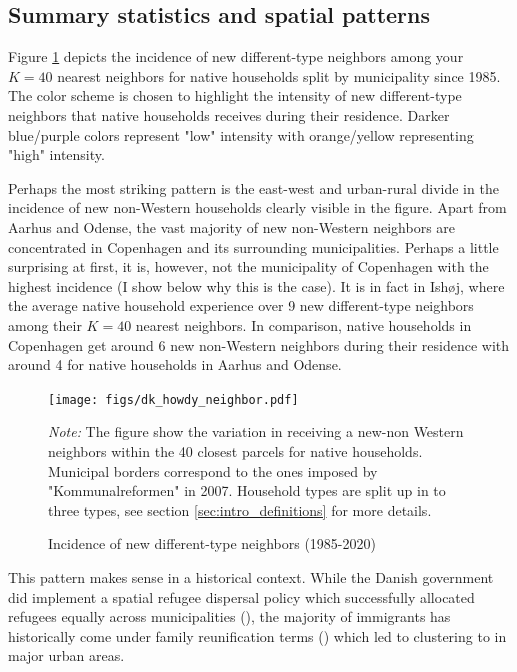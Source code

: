 \documentclass[main.tex]{subfiles}
\begin{document}
 \newpage
\subsection{Summary statistics and spatial patterns}
Figure \ref{fig:incidence_different_type_dk} depicts the incidence of new different-type neighbors among your $K=40$ nearest neighbors for native households split by municipality since 1985. The color scheme is chosen to highlight the intensity of new different-type neighbors that native households receives during their residence. Darker blue/purple colors represent "low" intensity with orange/yellow representing "high" intensity.

Perhaps the most striking pattern is the east-west and urban-rural divide in the incidence of new non-Western households clearly visible in the figure. Apart from Aarhus and Odense, the vast majority of new non-Western neighbors are concentrated in Copenhagen and its surrounding municipalities. Perhaps a little surprising at first, it is, however, not the municipality of Copenhagen with the highest incidence (I show below why this is the case). It is in fact in Ishøj, where the average native household experience over 9 new different-type neighbors among their $K=40$ nearest neighbors. In comparison, native households in Copenhagen get around 6 new non-Western neighbors during their residence with around 4 for native households in Aarhus and Odense. 


\begin{figure}[H]
    \centering
    \caption{Incidence of new different-type neighbors (1985-2020)}
    \texttt{[image: figs/dk\_howdy\_neighbor.pdf]}
    \label{fig:incidence_different_type_dk}
\begin{tablenotes}
\item \footnotesize \textit{Note:} The figure show the variation in receiving a new-non Western neighbors within the 40 closest parcels for native households. Municipal borders correspond to the ones imposed by "Kommunalreformen" in 2007. Household types are split up in to three types, see section \ref{sec:intro_definitions} for more details.
\end{tablenotes}
\end{figure}

This pattern makes sense in a historical context. While the Danish government did implement a spatial refugee dispersal policy which successfully allocated refugees equally across municipalities (\textcite{hasager2024sick_poor_neighborhood}), the majority of immigrants has historically come under family reunification terms (\textcite{dst_hvor_bor_indvandrere}) which led to clustering to in major urban areas. 
\end{document}
